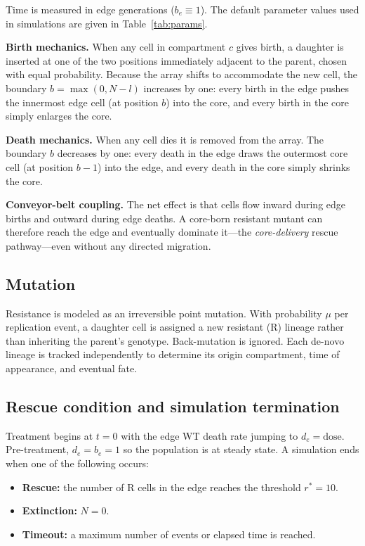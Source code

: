 \documentclass[12pt]{article}
\newcommand{\bEdge}{b_e}
\newcommand{\dEdge}{d_e}
\begin{document}
Time is measured in edge generations ($\bEdge \equiv 1$). The default
parameter values used in simulations are given in Table~\ref{tab:params}.

\textbf{Birth mechanics.} When any cell in compartment $c$ gives birth, a
daughter is inserted at one of the two positions immediately adjacent to the
parent, chosen with equal probability. Because the array shifts to accommodate
the new cell, the boundary $b = \max(0, N-l)$ increases by one: every birth
in the edge pushes the innermost edge cell (at position $b$) into the core,
and every birth in the core simply enlarges the core.

\textbf{Death mechanics.} When any cell dies it is removed from the array.
The boundary $b$ decreases by one: every death in the edge draws the outermost
core cell (at position $b-1$) into the edge, and every death in the core
simply shrinks the core.

\textbf{Conveyor-belt coupling.} The net effect is that cells flow inward
during edge births and outward during edge deaths. A core-born resistant
mutant can therefore reach the edge and eventually dominate it---the
\emph{core-delivery} rescue pathway---even without any directed migration.

\subsection{Mutation}

Resistance is modeled as an irreversible point mutation. With probability
$\mu$ per replication event, a daughter cell is assigned a new resistant (R)
lineage rather than inheriting the parent's genotype. Back-mutation is
ignored. Each de-novo lineage is tracked independently to determine its
origin compartment, time of appearance, and eventual fate.

\subsection{Rescue condition and simulation termination}

Treatment begins at $t = 0$ with the edge WT death rate jumping to
$\dEdge = \text{dose}$. Pre-treatment, $\dEdge = \bEdge = 1$ so the
population is at steady state. A simulation ends when one of the following
occurs:
\begin{itemize}
    \item \textbf{Rescue:} the number of R cells in the edge reaches the
        threshold $r^* = 10$.
    \item \textbf{Extinction:} $N = 0$.
    \item \textbf{Timeout:} a maximum number of events or elapsed time
        is reached.
\end{itemize}
\end{document}
